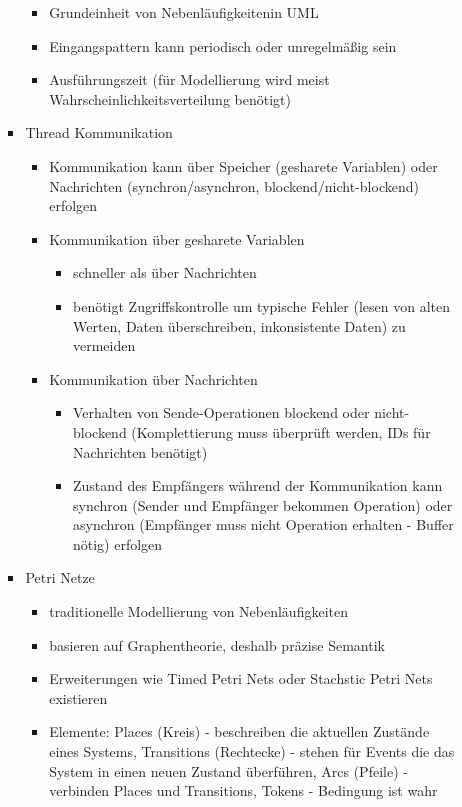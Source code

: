 \documentclass[paper=a4, fontsize=11pt]{scrartcl} %
\numberwithin{equation}{section} %
\numberwithin{figure}{section} %
\numberwithin{table}{section} %
\begin{document}
\begin{itemize}
\begin{itemize}
\begin{itemize}
      \begin{itemize}
        \item Grundeinheit von Nebenläufigkeitenin UML
        \item Eingangspattern kann periodisch oder unregelmäßig sein
        \item Ausführungszeit (für Modellierung wird meist Wahrscheinlichkeitsverteilung benötigt)
      \end{itemize}
      \item Thread Kommunikation
      \begin{itemize}
        \item Kommunikation kann über Speicher (gesharete Variablen) oder Nachrichten (synchron/asynchron, blockend/nicht-blockend) erfolgen
        \item Kommunikation über gesharete Variablen
        \begin{itemize}
          \item schneller als über Nachrichten
          \item benötigt Zugriffskontrolle um typische Fehler (lesen von alten Werten, Daten überschreiben, inkonsistente Daten) zu vermeiden
        \end{itemize}
        \item Kommunikation über Nachrichten
        \begin{itemize}
          \item Verhalten von Sende-Operationen blockend oder nicht-blockend (Komplettierung muss überprüft werden, IDs für Nachrichten benötigt)
          \item Zustand des Empfängers während der Kommunikation kann synchron (Sender und Empfänger bekommen Operation) oder asynchron (Empfänger muss nicht Operation erhalten - Buffer nötig) erfolgen
        \end{itemize}
      \end{itemize}
      \item Petri Netze
      \begin{itemize}
        \item traditionelle Modellierung von Nebenläufigkeiten
        \item basieren auf Graphentheorie, deshalb präzise Semantik
        \item Erweiterungen wie Timed Petri Nets oder Stachstic Petri Nets existieren
        \item Elemente: Places (Kreis) - beschreiben die aktuellen Zustände eines Systems, Transitions (Rechtecke) - stehen für Events die das System in einen neuen Zustand überführen, Arcs (Pfeile) - verbinden Places und Transitions, Tokens - Bedingung ist wahr

\end{itemize}
\end{itemize}
\end{itemize}
\end{itemize}
\end{document}
